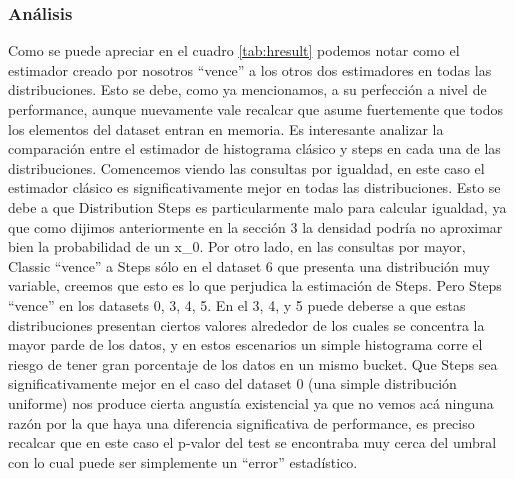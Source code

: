\subsubsection*{Análisis}
Como se puede apreciar en el cuadro \ref{tab:hresult} podemos notar como el estimador creado por nosotros ``vence'' a los otros dos estimadores en todas las distribuciones. Esto se debe, como ya mencionamos, a su perfección a nivel de performance, aunque nuevamente vale recalcar que asume fuertemente que todos los elementos del dataset entran en memoria.
Es interesante analizar la comparación entre el estimador de histograma clásico y steps en cada una de las distribuciones. Comencemos viendo las consultas por igualdad, en este caso el estimador clásico es significativamente mejor en todas las distribuciones. Esto se debe a que Distribution Steps es particularmente malo para calcular igualdad, ya que como dijimos anteriormente en la sección 3 la densidad podría no aproximar bien la probabilidad de un x_0.
Por otro lado, en las consultas por mayor, Classic ``vence'' a Steps sólo en el dataset 6 que presenta una distribución muy variable, creemos que esto es lo que perjudica la estimación de Steps. Pero Steps ``vence'' en los datasets 0, 3, 4, 5. En el 3, 4, y 5 puede deberse a que estas distribuciones presentan ciertos valores alrededor de los cuales se concentra la mayor parde de los datos, y en estos escenarios un simple histograma corre el riesgo de tener gran porcentaje de los datos en un mismo bucket. Que Steps sea significativamente mejor en el caso del dataset 0 (una simple distribución uniforme) nos produce cierta angustía existencial ya que no vemos acá ninguna razón por la que haya una diferencia significativa de performance, es preciso recalcar que en este caso el p-valor del test se encontraba muy cerca del umbral con lo cual puede ser simplemente un ``error'' estadístico.